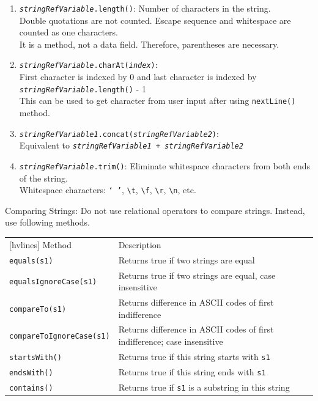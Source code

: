 \documentclass{article}
\begin{document}
\begin{enumerate}
	\item \texttt{\textit{stringRefVariable}.length()}: Number of characters in the string.\\
	Double quotations are not counted. Escape sequence and whitespace are counted as one characters.\\
	It is a method, not a data field. Therefore, parentheses are necessary.
	\item \texttt{\textit{stringRefVariable}.charAt(\textit{index})}:\\
	First character is indexed by 0 and last character is indexed by \texttt{\textit{stringRefVariable}.length()} - 1\\
	This can be used to get character from user input after using \texttt{nextLine()} method.
	\item \texttt{\textit{stringRefVariable1}.concat(\textit{stringRefVariable2})}:\\
	Equivalent to \texttt{\textit{stringRefVariable1} + \textit{stringRefVariable2}}
	\item \texttt{\textit{stringRefVariable}.trim()}: Eliminate whitespace characters from both ends of the string.\\
	Whitespace characters: \texttt{` '}, \texttt{\textbackslash t}, \texttt{\textbackslash f}, \texttt{\textbackslash r}, \texttt{\textbackslash n}, etc.
\end{enumerate}

Comparing Strings: Do not use relational operators to compare strings. Instead, use following methods.

\begin{table}[h!]
	\centering
	\begin{NiceTabular}{||ll||}[hvlines]
		\RowStyle{\bfseries}Method & Description\\
		\texttt{equals(s1)} & Returns true if two strings are equal\\
		\texttt{equalsIgnoreCase(s1)} & Returns true if two strings are equal, case insensitive\\
		\texttt{compareTo(s1)} & Returns difference in ASCII codes of first indifference\\
		\texttt{compareToIgnoreCase(s1)} & Returns difference in ASCII codes of first indifference; case insensitive\\
		\texttt{startsWith()} & Returns true if this string starts with \texttt{s1}\\
		\texttt{endsWith()} & Returns true if this string ends with \texttt{s1}\\
		\texttt{contains()} & Returns true if \texttt{s1} is a substring in this string
	\end{NiceTabular}
\end{table}
\end{document}
